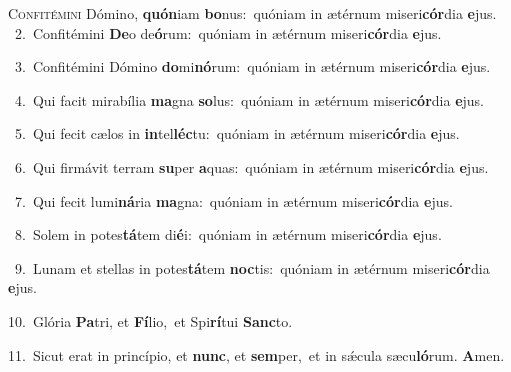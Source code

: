 \lettrine{\initial\textcolor{\initialcolor}{C}}{onfitémini} Dómino, \textbf{quón}\-iam \textbf{bo}\-nus:~\star quóniam in ætérnum miseri\-\textbf{cór}\-dia \textbf{e}\-jus.\\
{\numbfont\textcolor{\numbcolor}{~2.}}~Confitémini \textbf{De}\-o de\-\textbf{ó}\-rum:~\star quóniam in ætérnum miseri\-\textbf{cór}\-dia \textbf{e}\-jus.\par
{\numbfont\textcolor{\numbcolor}{~3.}}~Confitémini Dómino \textbf{do}\-mi\-\textbf{nó}\-rum:~\star quóniam in ætérnum miseri\-\textbf{cór}\-dia \textbf{e}\-jus.\par
{\numbfont\textcolor{\numbcolor}{~4.}}~Qui facit mirabília \textbf{ma}\-gna \textbf{so}\-lus:~\star quóniam in ætérnum miseri\-\textbf{cór}\-dia \textbf{e}\-jus.\par
{\numbfont\textcolor{\numbcolor}{~5.}}~Qui fecit cælos in \textbf{in}\-tel\-\textbf{léc}\-tu:~\star quóniam in ætérnum miseri\-\textbf{cór}\-dia \textbf{e}\-jus.\par
{\numbfont\textcolor{\numbcolor}{~6.}}~Qui firmávit terram \textbf{su}\-per \textbf{a}\-quas:~\star quóniam in ætérnum miseri\-\textbf{cór}\-dia \textbf{e}\-jus.\par
{\numbfont\textcolor{\numbcolor}{~7.}}~Qui fecit lumi\-\textbf{ná}\-ria \textbf{ma}\-gna:~\star quóniam in ætérnum miseri\-\textbf{cór}\-dia \textbf{e}\-jus.\par
{\numbfont\textcolor{\numbcolor}{~8.}}~Solem in potes\-\textbf{tá}\-tem di\-\textbf{é}\-i:~\star quóniam in ætérnum miseri\-\textbf{cór}\-dia \textbf{e}\-jus.\par
{\numbfont\textcolor{\numbcolor}{~9.}}~Lunam et stellas in potes\-\textbf{tá}\-tem \textbf{noc}\-tis:~\star quóniam in ætérnum miseri\-\textbf{cór}\-dia \textbf{e}\-jus.\par
{\numbfont\textcolor{\numbcolor}{10.}}~Glória \textbf{Pa}\-tri, et \textbf{Fí}\-lio,~\star et Spi\-\textbf{rí}\-tui \textbf{Sanc}\-to.\par
{\numbfont\textcolor{\numbcolor}{11.}}~Sicut erat in princípio, et \textbf{nunc}\-, et \textbf{sem}\-per,~\star et in sǽcula sæcu\-\textbf{ló}\-rum. \textbf{A}\-men.\par
